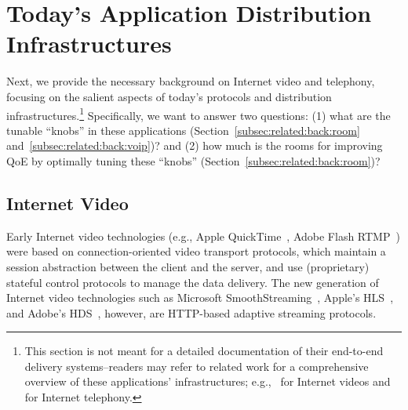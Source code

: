 \section{Today's Application Distribution Infrastructures}
\label{sec:related:back}


Next, we provide the necessary background on Internet video and telephony, 
focusing on the salient aspects of today's  protocols 
and distribution infrastructures.\footnote{This section is not meant for a detailed documentation of 
their end-to-end delivery systems--readers may refer to 
related work for a comprehensive 
overview of these applications' infrastructures; 
e.g.,~\cite{seufert2015survey}
for Internet videos and~\cite{baset2004analysis} for Internet telephony.} 
Specifically, we want to answer two questions:
(1) what are the tunable ``knobs'' in these applications
(Section~\ref{subsec:related:back:room} and~\ref{subsec:related:back:voip})? 
and (2) how much is the rooms for improving QoE by optimally tuning these ``knobs''
(Section~\ref{subsec:related:back:room})? 

\subsection{Internet Video}
\label{subsec:related:back:video}

Early Internet video technologies (e.g.,  Apple QuickTime~\cite{quicktime}, Adobe Flash
RTMP~\cite{rtmp}) were  based on connection-oriented video transport protocols, 
which maintain a session  abstraction between the client and the server, 
and use (proprietary) stateful control protocols to manage the data delivery.  
The new generation of Internet video technologies such as Microsoft
SmoothStreaming~\cite{SmoothStreaming}, Apple's HLS~\cite{hls}, and Adobe's
HDS~\cite{hds}, however, are HTTP-based adaptive streaming protocols.

